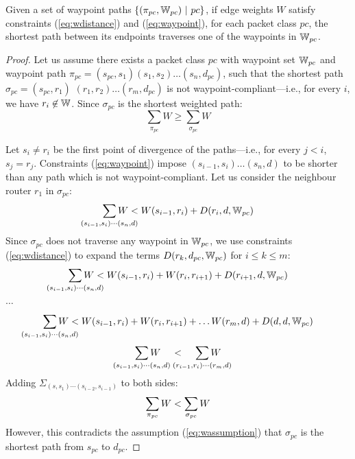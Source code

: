 \begin{theorem}[Soundness] \label{thm:waypoint}
	Given a set of waypoint paths $\{(\pi_{pc}, \mathbb{W}_{pc}) ~|~ pc\}$, if edge weights 
	$W$ satisfy constraints (\ref{eq:wdistance}) and (\ref{eq:waypoint}), for
	each packet class $pc$, the shortest path between its endpoints
	traverses one of the waypoints in $\mathbb{W}_{pc}$.
\end{theorem}
\begin{proof}
	Let us assume there exists a packet class $pc$ with waypoint set $\mathbb{W}_{pc}$ 
	and waypoint path $\pi_{pc} = (s_{pc}, s_1)(s_1, s_2)\ldots (s_n, d_{pc})$, 
	such that  the 
	shortest path $\sigma_{pc}=(s_{pc}, r_1)$ $(r_1, r_2)\ldots (r_m, d_{pc})$ 
	is not waypoint-compliant---i.e.,  
	for every $i$, we have $r_i\not\in \mathbb{W}$.	
	Since $\sigma_{pc}$ is the shortest weighted path: 
	\begin{equation} \label{eq:wassumption}
	\sum_{\pi_{pc}} W \geq \sum_{\sigma_{pc}} W
	\end{equation}

	
	Let $s_i \not= r_i$ be the first point of divergence of the paths---i.e., for every $j<i$, $s_{j} = r_{j}$.
Constraints (\ref{eq:waypoint}) impose 
$(s_{i-1}, s_i)\ldots(s_n, d)$ to be 
shorter than any path which is not waypoint-compliant. 
Let us consider the neighbour router $r_1$ in $\sigma_{pc}$:
	\[
	\sum_{\mathclap{\substack{(s_{i-1}, s_i)\cdots(s_n, d)}}} 
	W < W(s_{i-1}, r_i)+ D(r_i, d, \waypt_{pc})
	\]
	Since $\sigma_{pc}$ does not traverse any waypoint in $\mathbb{W}_{pc}$,
	we use constraints (\ref{eq:wdistance}) 
	to expand the terms $D(r_k, d_{pc}, \mathbb{W}_{pc})$ for $i \leq k \leq m$:
	\[
	\sum_{\mathclap{\substack{(s_{i-1}, s_i)\cdots(s_n, d)}}} 
	W < W(s_{i-1}, r_i)+ W(r_i, r_{i+1}) + D(r_{i+1}, d,\waypt_{pc})
	\] 
	\begin{center}
		$\ldots$
	\end{center}
	\[
	\sum_{\mathclap{\substack{(s_{i-1}, s_i)\cdots(s_n, d)}}} 
	W < W(s_{i-1}, r_i)+ W(r_i, r_{i+1}) + \ldots W(r_{m}, d) + D(d, d, \waypt_{pc})
	\] 
	\[
	\sum_{\mathclap{\substack{(s_{i-1}, s_i)\cdots(s_n, d)}}} 
	W \hspace{0.4cm}< \hspace{0.4cm}
	\sum_{\mathclap{\substack{(r_{i-1}, r_i)\cdots(r_m, d)}}} 
	W
	\]
	Adding $\Sigma_{(s, s_1)\cdots(s_{i-2},s_{i-1})}$ to both sides:
	\[
	\sum_{\mathclap{\substack{\pi_{pc}}}} 
	W < 
	\sum_{\mathclap{\substack{\sigma_{pc}}}} 
	W
	\] 
However, this contradicts the assumption (\ref{eq:wassumption}) that 
$\sigma_{pc}$ is the shortest path from $s_{pc}$ to $d_{pc}$. 
\end{proof}

